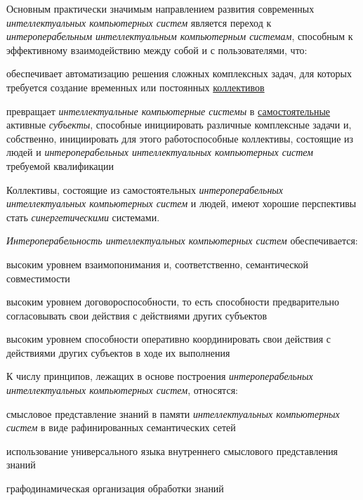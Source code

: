 \begin{textitemize}
	\item Основным практически значимым направлением развития современных \textit{интеллектуальных компьютерных систем} является переход к \textit{интероперабельным} \textit{интеллектуальным компьютерным системам}, способным к эффективному взаимодействию между собой и с пользователями, что:
	\begin{textitemize}
		\item обеспечивает автоматизацию решения сложных комплексных задач, для которых требуется создание временных или постоянных \underline{коллективов}
		\item превращает \textit{интеллектуальные компьютерные системы} в \underline{самостоятельные} активные \textit{субъекты}, способные инициировать различные комплексные задачи и, собственно, инициировать для этого работоспособные коллективы, состоящие из людей и \textit{интероперабельных интеллектуальных компьютерных систем} требуемой квалификации 
	\end{textitemize}
	\item Коллективы, состоящие из самостоятельных \textit{интероперабельных интеллектуальных компьютерных систем} и людей, имеют хорошие перспективы стать \textit{синергетическими} системами.
	\item \textit{Интероперабельность интеллектуальных компьютерных систем} обеспечивается:
	\begin{textitemize}
		\item высоким уровнем взаимопонимания и, соответственно, семантической совместимости
		\item высоким уровнем договороспособности, то есть способности предварительно согласовывать свои действия с действиями других субъектов
		\item высоким уровнем способности оперативно координировать свои действия с действиями других субъектов в ходе их выполнения
	\end{textitemize}
	\item К числу принципов, лежащих в основе построения \textit{интероперабельных интеллектуальных компьютерных систем}, относятся:
	\begin{textitemize}
		\item смысловое представление знаний в памяти \textit{интеллектуальных компьютерных систем} в виде рафинированных семантических сетей
		\item использование универсального языка внутреннего смыслового представления знаний
		\item графодинамическая организация обработки знаний

\end{textitemize}
\end{textitemize}
